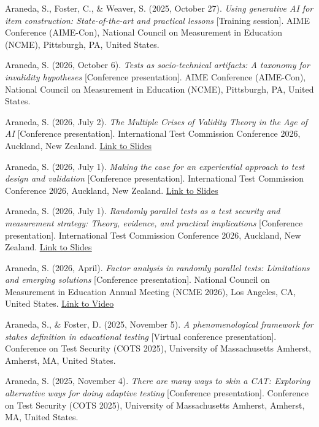 \documentclass[10.5pt]{article}
\newcommand{\link}[2]{\href{#1}{\color{cvaccent}\uline{#2}}}
\newcommand{\cvsubsection}[1]{%
  \Needspace{3\baselineskip}\par\vspace{9pt}{\bfseries\fontsize{10.5}{13}\selectfont\color{cvaccent} \MakeUppercase{#1}}\par\vspace{4pt}%
}
\newcommand{\pubentry}[2]{%
  \par\noindent\hangindent=14pt\hangafter=1\raggedright\color{cvink}#1\par\vspace{9pt}%
}
\begin{document}
\cvsubsection{Training Sessions}
\pubentry{Araneda, S., Foster, C., \& Weaver, S. (2025, October 27). \textit{Using generative AI for item construction: State-of-the-art and practical lessons} [Training session]. AIME Conference (AIME-Con), National Council on Measurement in Education (NCME), Pittsburgh, PA, United States.}{aimecon.png}
\cvsubsection{Individual Presentations}
\pubentry{Araneda, S. (2026, October 6). \textit{Tests as socio-technical artifacts: A taxonomy for invalidity hypotheses} [Conference presentation]. AIME Conference (AIME-Con), National Council on Measurement in Education (NCME), Pittsburgh, PA, United States.}{aimecon.png}
\pubentry{Araneda, S. (2026, July 2). \textit{The Multiple Crises of Validity Theory in the Age of AI} [Conference presentation]. International Test Commission Conference 2026, Auckland, New Zealand. \link{https://www.researchgate.net/publication/408184953_The_Multiple_Crises_of_Validity_Theory_in_the_Age_of_AI}{Link to Slides}}{itc_2026.png}
\pubentry{Araneda, S. (2026, July 1). \textit{Making the case for an experiential approach to test design and validation} [Conference presentation]. International Test Commission Conference 2026, Auckland, New Zealand. \link{https://www.researchgate.net/publication/408184695_Making_the_Case_for_An_Experiential_Approach_to_Test_Design_and_Validation}{Link to Slides}}{itc_2026.png}
\pubentry{Araneda, S. (2026, July 1). \textit{Randomly parallel tests as a test security and measurement strategy: Theory, evidence, and practical implications} [Conference presentation]. International Test Commission Conference 2026, Auckland, New Zealand. \link{https://www.researchgate.net/publication/408184705_Randomly_Parallel_Tests_as_a_Test_Security_and_Measurement_Strategy_Theory_Evidence_and_Practical_Implications}{Link to Slides}}{itc_2026.png}
\pubentry{Araneda, S. (2026, April). \textit{Factor analysis in randomly parallel tests: Limitations and emerging solutions} [Conference presentation]. National Council on Measurement in Education Annual Meeting (NCME 2026), Los Angeles, CA, United States. \link{https://www.youtube.com/watch?v=XPnhPopyrnQ&t=587s}{Link to Video}}{ncme_2026.png}
\pubentry{Araneda, S., \& Foster, D. (2025, November 5). \textit{A phenomenological framework for stakes definition in educational testing} [Virtual conference presentation]. Conference on Test Security (COTS 2025), University of Massachusetts Amherst, Amherst, MA, United States.}{cots2025.png}
\pubentry{Araneda, S. (2025, November 4). \textit{There are many ways to skin a CAT: Exploring alternative ways for doing adaptive testing} [Conference presentation]. Conference on Test Security (COTS 2025), University of Massachusetts Amherst, Amherst, MA, United States.}{cots2025.png}
\end{document}
